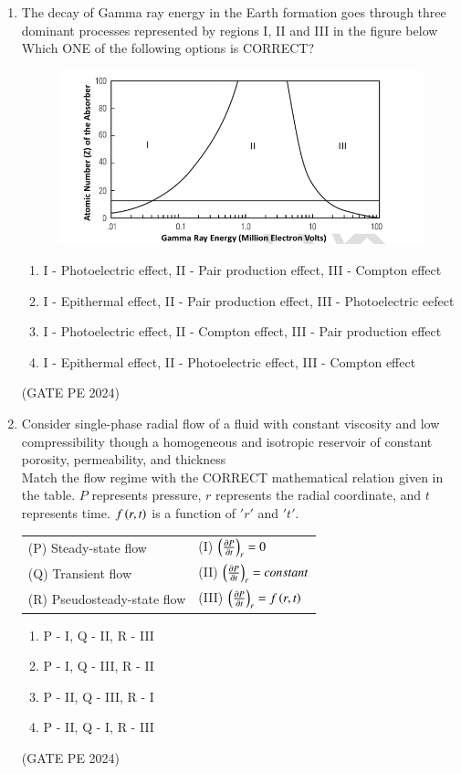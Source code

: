 \documentclass[journal,12pt,onecolumn]{IEEEtran}
\theoremstyle{remark}
\begin{document}
\begin{enumerate}
\item The decay of Gamma ray energy in the Earth formation goes through three dominant processes represented by regions I, II and III in the figure below
Which ONE of the following options is CORRECT?
\begin{figure}[H]
    \centering
    \includegraphics[width=0.5\columnwidth]{LQ_45.png}
    \caption{}
    \label{fig:placeholder}
\end{figure}
\begin{enumerate}
    \item I - Photoelectric effect, II - Pair production effect, III - Compton effect
    \item I - Epithermal effect, II - Pair production effect, III - Photoelectric eefect
    \item I - Photoelectric effect, II - Compton effect, III - Pair production effect
    \item I - Epithermal effect, II - Photoelectric effect, III - Compton effect
\end{enumerate}
\hfill{(GATE PE 2024)}

\item Consider single-phase radial flow of a fluid with constant viscosity and low compressibility though a homogeneous and isotropic reservoir of constant porosity, permeability, and thickness\\
Match the flow regime with the CORRECT mathematical relation given in the table. $P$ represents pressure, $r$ represents the radial coordinate, and $t$ represents time. $f\left(r,t\right)$ is a function of $'r'$ and $'t'$.
\begin{tabular}{ll}
(P) Steady-state flow& (I) $\left(\frac{\partial P}{\partial t}\right)_r=0$ \\
(Q) Transient flow& (II) $\left(\frac{\partial P}{\partial t}\right)_r=constant$\\
(R) Pseudosteady-state flow& (III) $\left(\frac{\partial P}{\partial t}\right)_r=f\left(r,t\right)$ \\
\end{tabular}
\begin{enumerate}
    \item P - I, Q - II, R - III 
    \item P - I, Q - III, R - II 
    \item P - II, Q - III, R - I
    \item P - II, Q - I, R - III
\end{enumerate}
\hfill{(GATE PE 2024)}


\end{enumerate}
\end{document}
